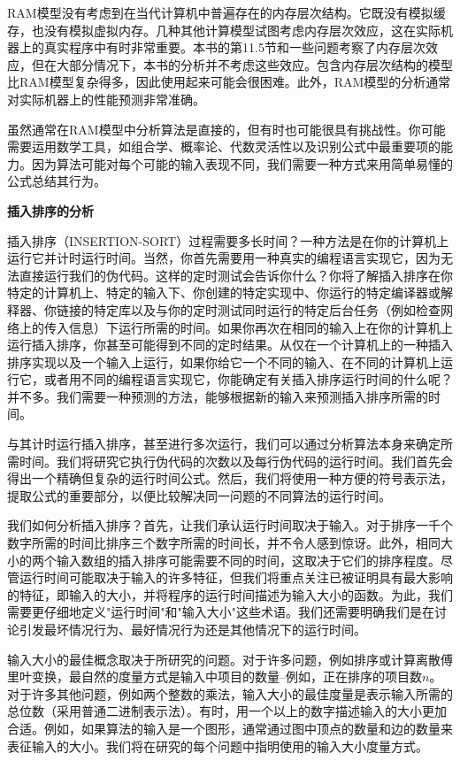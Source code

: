 \documentclass[lang=cn,newtx,10pt,scheme=chinese]{elegantbook}
\begin{document}
RAM模型没有考虑到在当代计算机中普遍存在的内存层次结构。它既没有模拟缓存，也没有模拟虚拟内存。几种其他计算模型试图考虑内存层次效应，这在实际机器上的真实程序中有时非常重要。本书的第11.5节和一些问题考察了内存层次效应，但在大部分情况下，本书的分析并不考虑这些效应。包含内存层次结构的模型比RAM模型复杂得多，因此使用起来可能会很困难。此外，RAM模型的分析通常对实际机器上的性能预测非常准确。

虽然通常在RAM模型中分析算法是直接的，但有时也可能很具有挑战性。你可能需要运用数学工具，如组合学、概率论、代数灵活性以及识别公式中最重要项的能力。因为算法可能对每个可能的输入表现不同，我们需要一种方式来用简单易懂的公式总结其行为。

\textbf{插入排序的分析}

插入排序（INSERTION-SORT）过程需要多长时间？一种方法是在你的计算机上运行它并计时运行时间。当然，你首先需要用一种真实的编程语言实现它，因为无法直接运行我们的伪代码。这样的定时测试会告诉你什么？你将了解插入排序在你特定的计算机上、特定的输入下、你创建的特定实现中、你运行的特定编译器或解释器、你链接的特定库以及与你的定时测试同时运行的特定后台任务（例如检查网络上的传入信息）下运行所需的时间。如果你再次在相同的输入上在你的计算机上运行插入排序，你甚至可能得到不同的定时结果。从仅在一个计算机上的一种插入排序实现以及一个输入上运行，如果你给它一个不同的输入、在不同的计算机上运行它，或者用不同的编程语言实现它，你能确定有关插入排序运行时间的什么呢？并不多。我们需要一种预测的方法，能够根据新的输入来预测插入排序所需的时间。

与其计时运行插入排序，甚至进行多次运行，我们可以通过分析算法本身来确定所需时间。我们将研究它执行伪代码的次数以及每行伪代码的运行时间。我们首先会得出一个精确但复杂的运行时间公式。然后，我们将使用一种方便的符号表示法，提取公式的重要部分，以便比较解决同一问题的不同算法的运行时间。

我们如何分析插入排序？首先，让我们承认运行时间取决于输入。对于排序一千个数字所需的时间比排序三个数字所需的时间长，并不令人感到惊讶。此外，相同大小的两个输入数组的插入排序可能需要不同的时间，这取决于它们的排序程度。尽管运行时间可能取决于输入的许多特征，但我们将重点关注已被证明具有最大影响的特征，即输入的大小，并将程序的运行时间描述为输入大小的函数。为此，我们需要更仔细地定义"运行时间"和"输入大小"这些术语。我们还需要明确我们是在讨论引发最坏情况行为、最好情况行为还是其他情况下的运行时间。

输入大小的最佳概念取决于所研究的问题。对于许多问题，例如排序或计算离散傅里叶变换，最自然的度量方式是输入中项目的数量--例如，正在排序的项目数$n$。对于许多其他问题，例如两个整数的乘法，输入大小的最佳度量是表示输入所需的总位数（采用普通二进制表示法）。有时，用一个以上的数字描述输入的大小更加合适。例如，如果算法的输入是一个图形，通常通过图中顶点的数量和边的数量来表征输入的大小。我们将在研究的每个问题中指明使用的输入大小度量方式。
\end{document}

